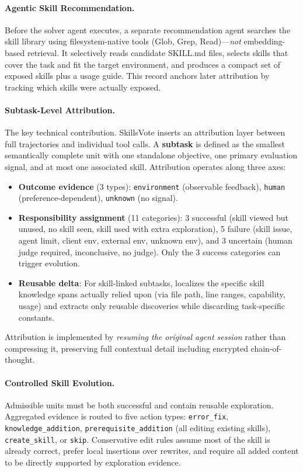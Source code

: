 \documentclass[11pt,a4paper]{article}
\begin{document}
\paragraph{Agentic Skill Recommendation.}
Before the solver agent executes, a separate recommendation agent searches the skill library using filesystem-native tools (Glob, Grep, Read)---\textit{not} embedding-based retrieval. It selectively reads candidate SKILL.md files, selects skills that cover the task and fit the target environment, and produces a compact set of exposed skills plus a usage guide. This record anchors later attribution by tracking which skills were actually exposed.

\paragraph{Subtask-Level Attribution.}
The key technical contribution. SkillsVote inserts an attribution layer between full trajectories and individual tool calls. A \textbf{subtask} is defined as the smallest semantically complete unit with one standalone objective, one primary evaluation signal, and at most one associated skill. Attribution operates along three axes:

\begin{itemize}[nosep]
\item \textbf{Outcome evidence} (3 types): \texttt{environment} (observable feedback), \texttt{human} (preference-dependent), \texttt{unknown} (no signal).
\item \textbf{Responsibility assignment} (11 categories): 3 successful (skill viewed but unused, no skill seen, skill used with extra exploration), 5 failure (skill issue, agent limit, client env, external env, unknown env), and 3 uncertain (human judge required, inconclusive, no judge). Only the 3 success categories can trigger evolution.
\item \textbf{Reusable delta}: For skill-linked subtasks, localizes the specific skill knowledge spans actually relied upon (via file path, line ranges, capability, usage) and extracts only reusable discoveries while discarding task-specific constants.
\end{itemize}

Attribution is implemented by \textit{resuming the original agent session} rather than compressing it, preserving full contextual detail including encrypted chain-of-thought.

\paragraph{Controlled Skill Evolution.}
Admissible units must be both successful and contain reusable exploration. Aggregated evidence is routed to five action types: \texttt{error\_fix}, \texttt{knowledge\_addition}, \texttt{prerequisite\_addition} (all editing existing skills), \texttt{create\_skill}, or \texttt{skip}. Conservative edit rules assume most of the skill is already correct, prefer local insertions over rewrites, and require all added content to be directly supported by exploration evidence.
\end{document}
